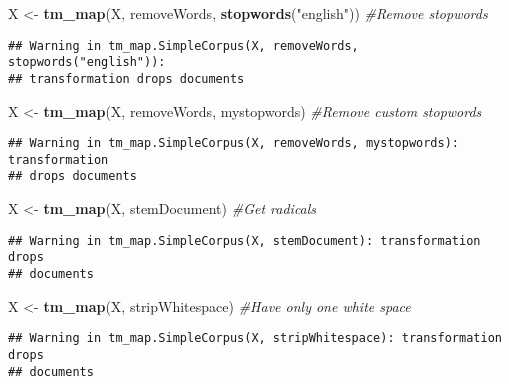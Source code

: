 \documentclass[]{article}
\newenvironment{Shaded}{\begin{snugshade}}{\end{snugshade}}
\newcommand{\CommentTok}[1]{\textcolor[rgb]{0.56,0.35,0.01}{\textit{#1}}}
\newcommand{\KeywordTok}[1]{\textcolor[rgb]{0.13,0.29,0.53}{\textbf{#1}}}
\newcommand{\NormalTok}[1]{#1}
\newcommand{\StringTok}[1]{\textcolor[rgb]{0.31,0.60,0.02}{#1}}
\begin{document}
\begin{Shaded}
\begin{Highlighting}[]
\NormalTok{X <-}\StringTok{ }\KeywordTok{tm_map}\NormalTok{(X, removeWords, }\KeywordTok{stopwords}\NormalTok{(}\StringTok{"english"}\NormalTok{)) }\CommentTok{#Remove stopwords}
\end{Highlighting}
\end{Shaded}

\begin{verbatim}
## Warning in tm_map.SimpleCorpus(X, removeWords, stopwords("english")):
## transformation drops documents
\end{verbatim}

\begin{Shaded}
\begin{Highlighting}[]
\NormalTok{X <-}\StringTok{ }\KeywordTok{tm_map}\NormalTok{(X, removeWords, mystopwords) }\CommentTok{#Remove custom stopwords}
\end{Highlighting}
\end{Shaded}

\begin{verbatim}
## Warning in tm_map.SimpleCorpus(X, removeWords, mystopwords): transformation
## drops documents
\end{verbatim}

\begin{Shaded}
\begin{Highlighting}[]
\NormalTok{X <-}\StringTok{ }\KeywordTok{tm_map}\NormalTok{(X, stemDocument) }\CommentTok{#Get radicals}
\end{Highlighting}
\end{Shaded}

\begin{verbatim}
## Warning in tm_map.SimpleCorpus(X, stemDocument): transformation drops
## documents
\end{verbatim}

\begin{Shaded}
\begin{Highlighting}[]
\NormalTok{X <-}\StringTok{ }\KeywordTok{tm_map}\NormalTok{(X, stripWhitespace) }\CommentTok{#Have only one white space}
\end{Highlighting}
\end{Shaded}

\begin{verbatim}
## Warning in tm_map.SimpleCorpus(X, stripWhitespace): transformation drops
## documents
\end{verbatim}
\end{document}
